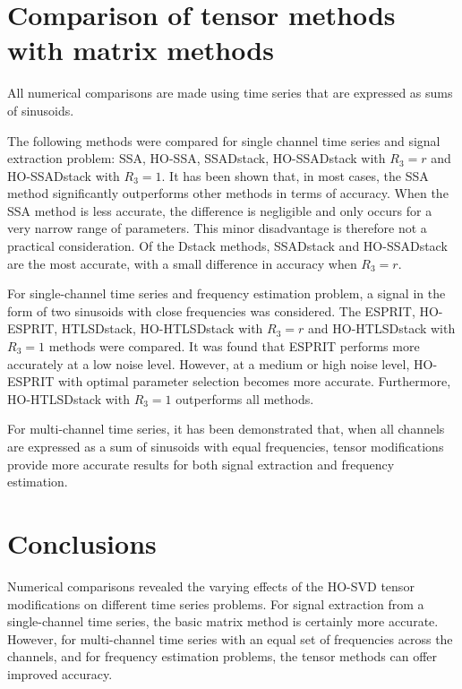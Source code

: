 \documentclass[12pt]{article}
\theoremstyle{definition}
\begin{document}
\section{Comparison of tensor methods with matrix methods}
All numerical comparisons are made using time series that are expressed as sums of sinusoids.

The following methods were compared for single channel time series
and signal extraction problem: SSA, HO-SSA, SSADstack, HO-SSADstack
with $R_3=r$ and HO-SSADstack with $R_3=1$. It has been shown that, in most cases, the SSA method significantly outperforms other methods in terms of accuracy. When the SSA method is less accurate, the difference is negligible and only occurs for a very narrow range of parameters. This minor disadvantage is therefore not a practical consideration. Of the Dstack methods, SSADstack and HO-SSADstack are the most accurate, with a small difference in accuracy when $R_3=r$.

For single-channel time series and frequency estimation problem, a
signal in the form of two sinusoids with close frequencies was
considered. The ESPRIT, HO-ESPRIT, HTLSDstack, HO-HTLSDstack with
$R_3=r$ and HO-HTLSDstack with $R_3=1$ methods were compared. It was found that ESPRIT performs more accurately at a low noise level. However, at a medium or high noise level, HO-ESPRIT with optimal parameter selection becomes more accurate. Furthermore, HO-HTLSDstack with $R_3=1$ outperforms all methods.

For multi-channel time series, it has been demonstrated that, when all channels are expressed as a sum of sinusoids with equal frequencies, tensor modifications provide more accurate results for both signal extraction and frequency estimation.

\section{Conclusions}
Numerical comparisons revealed the varying effects of the HO-SVD tensor modifications on different time series problems. For signal extraction from a single-channel time series, the basic matrix method is certainly more accurate. However, for multi-channel time series with an equal set of frequencies across the channels, and for frequency estimation problems, the tensor methods can offer improved accuracy.
\end{document}
